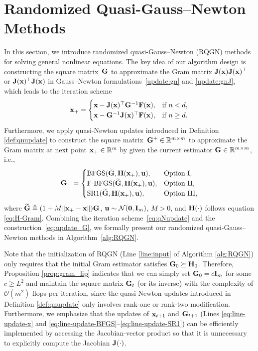 \documentclass[11pt]{article}
\theoremstyle{plain}
\theoremstyle{definition}
\theoremstyle{remark}
\theoremstyle{plain}
\def\vx{{\bf{x}}}
\def\fN{{\mathcal{N}}}
\def\BR{{\mathbb{R}}}
\def\mG {{\bf G}}
\def\mH {{\bf H}}
\def\mI {{\bf I}}
\def\mJ {{\bf J}}
\def\vx {{{\bf x}}}
\def\BR{{\mathbb{R}}}
\def\F{{\bf F}}
\def\G{{\bf G}}
\def\H{{\bf H}}
\def\I{{\bf I}}
\def \J{{\bf J}}
\def\u{{\bf u}}
\def\x{{\bf x}}
\def\0{{\bf 0}}
\def\OM{{\mathcal O}}
\def \srk{{\text{\rm SR1}}}
\def \bfgs{{\text{\rm BFGS}}}
\def \fbfgs{{\text{\rm F-BFGS}}}
\begin{document}
\section{Randomized Quasi-Gauss--Newton Methods}
\label{sec:rqn}
In this section, we introduce randomized quasi-Gauss--Newton (RQGN) methods for solving general nonlinear equations.
The key idea of our algorithm design is constructing the square matrix~$\G$ to approximate the Gram matrix $\mJ(\vx)\mJ(\vx)^\top$ or $\mJ(\vx)^\top\mJ(\vx)$ in Gauss--Newton formulations~\eqref{update:gn} and \eqref{update:gnJ}, which leads to the iteration scheme
\begin{align}
\label{eq:qNupdate}
    \x_{+}=\begin{cases}
      \x-\J(\x)^{\top}\G^{-1}\F(\x), &\text{if }n<d,\\
      \x-\G^{-1}\J(\x)^{\top}\F(\x), &\text{if }n\geq d.
    \end{cases}
\end{align}
Furthermore, we apply quasi-Newton updates introduced in Definition \ref{def:qnupdate} to construct the square matrix~$\mG^+\in\BR^{m\times m}$ to approximate the Gram matrix at next point $\vx_+\in\BR^m$ by given the current estimator $\G\in\BR^{m\times m}$, i.e.,
\begin{align}
\label{eq:update_G}
\G_{+}
=\begin{cases}
\bfgs(\widetilde{\G},\H(\x_{+}),\u), & \text{Option I},\\
\fbfgs(\widetilde{\G},\H(\x_{+}),\u), & \text{Option II},\\
\srk(\widetilde{\G},\H(\x_{+}),\u), & \text{Option III},
\end{cases}
\end{align}
where $\widetilde{\G}\triangleq (1+M\|\x_{+}-\x\|)\G$, $\u\sim\fN(\0,\I_m)$, $M>0$, and $\mH(\cdot)$ follows equation \eqref{eq:H-Gram}.
Combining the iteration scheme~\eqref{eq:qNupdate} and the construction~\eqref{eq:update_G}, we formally present our randomized quasi-Gauss--Newton methods in Algorithm~\ref{alg:RQGN}.

Note that the initialization of RQGN (Line \ref{line:input} of Algorithm \ref{alg:RQGN}) only requires that the initial Gram estimator satisfies $\G_0\succeq\H_0$. Therefore, Proposition \ref{prop:gram_lip} indicates that we can simply set $\mG_0=c\mI_m$ for some $c\geq L^2$ and maintain the square matrix $\mG_t$ (or its inverse) with the complexity of $\OM(m^2)$ flops per iteration, since the quasi-Newton updates introduced in Definition \ref{def:qnupdate} only involves rank-one or rank-two modification.
Furthermore, we emphasize that the updates of $\vx_{t+1}$ and $\mG_{t+1}$ (Lines \ref{eq:line-update-x} and \ref{eq:line-update-BFGS}--\ref{eq:line-update-SR1}) can be efficiently implemented by accessing the Jacobian-vector product so that it is unnecessary to explicitly compute the Jacobian $\mJ(\cdot)$.
\end{document}
